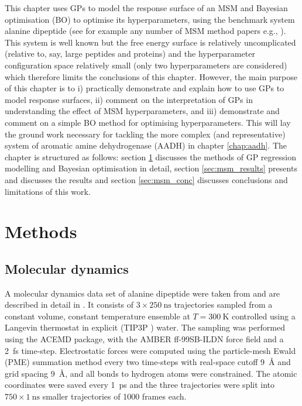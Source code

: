 This chapter uses GPs to model the response surface of an MSM  and Bayesian optimisation (BO) to optimise its hyperparameters, using the benchmark system alanine dipeptide (see for example any number of MSM method papers e.g.,  \cite{wehmeyerTimelaggedAutoencodersDeep2018a}\cite{nuskeVariationalApproachMolecular2014}\cite{bowmanQuantitativeComparisonAlternative2013}). This system is well known but the free energy surface is relatively uncomplicated (relative to, say, large peptides and proteins) and the hyperparameter configuration space relatively small (only two hyperparameters are considered) which therefore limits the conclusions of this chapter. However, the main purpose of this chapter is to i) practically demonstrate and explain how to use GPs to model response surfaces, ii) comment on the interpretation of GPs in understanding the effect of MSM hyperparameters, and iii) demonstrate and comment on a simple BO method for optimising hyperparameters. This will lay the ground work necessary for tackling the more complex (and representative) system of aromatic amine dehydrogenase (AADH) in chapter \ref{chap:aadh}. The chapter is structured as follows: section \ref{sec:msm_methods} discusses the methods of GP regression modelling and Bayesian optimisation in detail, section \ref{sec:msm_results} presents and discusses the results and section \ref{sec:msm_conc} discusses conclusions and limitations of this work. 

\section{Methods}\label{sec:msm_methods}
\subsection{Molecular dynamics}

 A molecular dynamics data set  of alanine dipeptide were taken from \cite{wehmeyerTimelaggedAutoencodersDeep2018a} and are described in detail in \cite{nuskeMarkovStateModels2017b}.  It consists of $3\times \SI{250}{\nano\second}$ trajectories sampled from a constant volume, constant temperature ensemble at $T=\SI{300}{\kelvin}$ controlled using a Langevin thermostat in explicit (TIP3P \cite{jorgensen1983comparison}) water.\cite{nuskeMarkovStateModels2017b} The sampling was performed using the ACEMD \cite{harveyACEMDAcceleratingBiomolecular2009} package, with the AMBER ff-99SB-ILDN \cite{lindorff-larsenImprovedSidechainTorsion2010} force field and a \SI{2}{\femto\second} time-step.\cite{nuskeMarkovStateModels2017b} Electrostatic forces were computed using the particle-mesh Ewald (PME) \cite{dardenParticleMeshEwald1993} summation method every two time-steps with  real-space cutoff \SI{9}{\angstrom} and grid spacing \SI{9}{\angstrom}, and all bonds to hydrogen atoms were constrained. \cite{nuskeMarkovStateModels2017b} The atomic coordinates were saved every \SI{1}{\pico\second} and the three trajectories were split into $750\times\SI{1}{\nano\second}$ smaller trajectories of \num{1000} frames each. 


